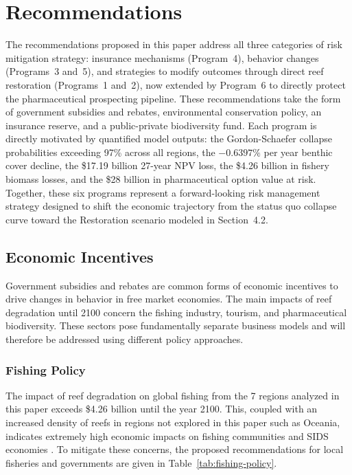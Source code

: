 \documentclass[10pt,letterpaper]{article}
\begin{document}
\section{Recommendations}

The recommendations proposed in this paper address all three categories of risk mitigation strategy: insurance mechanisms (Program~4), behavior changes (Programs~3 and~5), and strategies to modify outcomes through direct reef restoration (Programs~1 and~2), now extended by Program~6 to directly protect the pharmaceutical prospecting pipeline. These recommendations take the form of government subsidies and rebates, environmental conservation policy, an insurance reserve, and a public-private biodiversity fund. Each program is directly motivated by quantified model outputs: the Gordon-Schaefer collapse probabilities exceeding 97\% across all regions, the $-0.6397\%$ per year benthic cover decline, the \$17.19 billion 27-year NPV loss, the \$4.26 billion in fishery biomass losses, and the \$28 billion in pharmaceutical option value at risk. Together, these six programs represent a forward-looking risk management strategy designed to shift the economic trajectory from the status quo collapse curve toward the Restoration scenario modeled in Section~4.2.

\subsection{Economic Incentives}

Government subsidies and rebates are common forms of economic incentives to drive changes in behavior in free market economies. The main impacts of reef degradation until 2100 concern the fishing industry, tourism, and pharmaceutical biodiversity. These sectors pose fundamentally separate business models and will therefore be addressed using different policy approaches.

\subsubsection{Fishing Policy}

The impact of reef degradation on global fishing from the 7 regions analyzed in this paper exceeds \$4.26 billion until the year 2100. This, coupled with an increased density of reefs in regions not explored in this paper such as Oceania, indicates extremely high economic impacts on fishing communities and SIDS economies \cite{cesar_economics_2003}. To mitigate these concerns, the proposed recommendations for local fisheries and governments are given in Table~\ref{tab:fishing-policy}.
\end{document}
